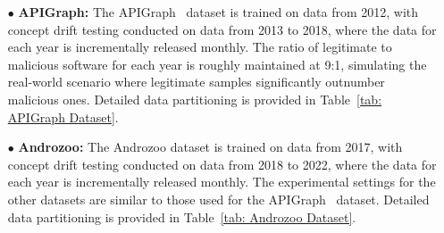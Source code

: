 \documentclass[lettersize,journal]{IEEEtran}
\begin{document}
\begin{itemize}[leftmargin=*]
	\item[$\bullet$] \textbf{APIGraph:} The APIGraph~\cite{2020-CCS-APIGraph} dataset is trained on data from 2012, with concept drift testing conducted on data from 2013 to 2018, where the data for each year is incrementally released monthly.
	The ratio of legitimate to malicious software for each year is roughly maintained at 9:1, simulating the real-world scenario where legitimate samples significantly outnumber malicious ones.
	Detailed data partitioning is provided in Table~\ref{tab: APIGraph Dataset}.
	
	\item[$\bullet$] \textbf{Androzoo:} The Androzoo\cite{2016-Androzoo} dataset is trained on data from 2017, with concept drift testing conducted on data from 2018 to 2022, where the data for each year is incrementally released monthly.
	The experimental settings for the other datasets are similar to those used for the APIGraph~\cite{2020-CCS-APIGraph} dataset.
	Detailed data partitioning is provided in Table~\ref{tab: Androzoo Dataset}.
	
	\begin{table}[h!]
		\caption{Android Concept Drift Dataset (Androzoo)}
		\label{tab: Androzoo Dataset}
		\setlength{\tabcolsep}{5.8pt}
		\begin{center}
		\end{center}
	\end{table}
	

\end{itemize}
\end{document}
